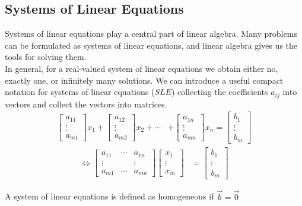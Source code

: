 \subsection{Systems of Linear Equations}
Systems of linear equations play a central part of linear algebra. Many problems can be formulated as systems of linear equations, and linear algebra gives us the tools for solving them.\\
In general, for a real-valued system of linear equations we obtain either no, exactly one, or infinitely many solutions. We can introduce a useful compact notation for systems of linear equations ($SLE$) collecting the coefficients $a_{ij}$ into vectors and collect the vectors into matrices.
\begin{align}
    \begin{bmatrix}
        a_{11}\\
        \vdots\\
        a_{m1}
    \end{bmatrix} x_1
    + \begin{bmatrix}
        a_{12}\\
        \vdots\\
        a_{m2}
    \end{bmatrix} x_2
    +\cdots&+
    \begin{bmatrix}
        a_{1n}\\
        \vdots\\
        a_{mn}
    \end{bmatrix} x_n
    = \begin{bmatrix}
        b_{1}\\
        \vdots\\
        b_{m}
    \end{bmatrix}
\end{align}
\begin{align}
    \Longleftrightarrow
    \begin{bmatrix}
        a_{11}& \cdots & a_{1n}\\
        \vdots& & \vdots\\
        a_{m1}& \cdots & a_{mn}
    \end{bmatrix}
    \begin{bmatrix}
        x_{1}\\
        \vdots\\
        x_{m}
    \end{bmatrix}
    &= \begin{bmatrix}
        b_{1}\\
        \vdots\\
        b_{m}
    \end{bmatrix}
\end{align}
\begin{definition}
    A system of linear equations is defined as homogeneous if $\vec{b} = \vec{0}$
\end{definition}
